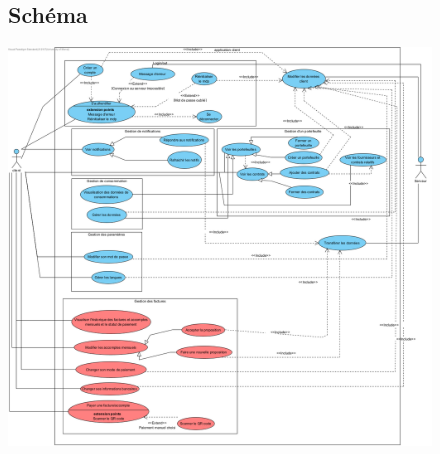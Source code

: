 \newpage
\begin{figure}[h]
\subsection{Schéma}
\centering
\includegraphics[width = 1\textwidth]{extension-maxime/usescases/img/usecases-extension.png}
\end{figure}




